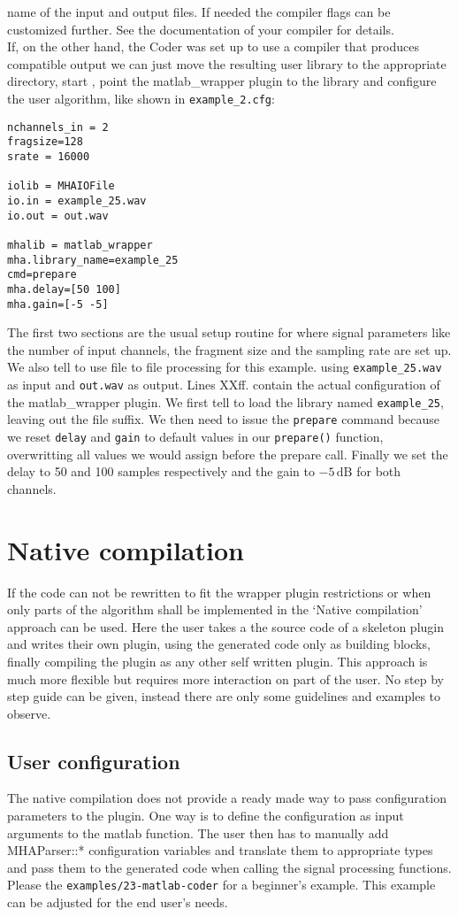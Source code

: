 \documentclass[11pt,a4paper,twoside]{article}
\newcommand{\+}{\discretionary{\mbox{\scriptsize$\hookleftarrow$}}{}{}}
\begin{document}
name of the input and output files. If needed the compiler flags can be customized further.
See the documentation of your compiler for details. \\
If, on the other hand, the \Matlab{} Coder was set up to use a compiler that produces \mha{} compatible
output we can just move the resulting user library to the appropriate directory, start \mha{}, 
point the matlab\_wrapper plugin to the library and configure the user
algorithm, like shown in \texttt{example\_2.cfg}:
\begin{lstlisting}
nchannels_in = 2
fragsize=128
srate = 16000

iolib = MHAIOFile
io.in = example_25.wav
io.out = out.wav

mhalib = matlab_wrapper
mha.library_name=example_25
cmd=prepare
mha.delay=[50 100]
mha.gain=[-5 -5]
\end{lstlisting}
The first two sections are the usual setup routine for \mha{} where signal
parameters like the number of input channels, the fragment size and the sampling
rate are set up. We also tell \mha{} to use file to file processing for this
example. using \texttt{example\_25.wav} as input and \texttt{out.wav} as output.
Lines XXff. contain the actual configuration of the matlab\_wrapper plugin. We
first tell \mha{} to load the library named \texttt{example\_25}, leaving out the
file suffix. We then need to issue the \texttt{prepare} command because we reset
\texttt{delay} and \texttt{gain} to default values in our \texttt{prepare()}
function, overwritting all values we would assign before the prepare call.
Finally we set the delay to 50 and 100 samples respectively and the
gain to $-5\,\mathrm{dB}$ for both channels.

\section{Native compilation}\label{sec:native compilation}
If the code can not be rewritten to fit the wrapper plugin restrictions or when
only parts of the algorithm shall be implemented in \Matlab{} the `Native
compilation' approach can be used.
Here the user takes a the source code of a skeleton \mha{} plugin and writes
their own plugin, using the generated code only as building blocks,
finally compiling the plugin as any other self written \mha{} plugin.
This approach is much more flexible but requires more interaction
on part of the user. No step by step guide can be given, instead there are only
some guidelines and examples to observe. 
\subsection{User configuration}
The native compilation does not provide a ready made way to pass configuration parameters to the plugin.
One way is to define the configuration as input arguments to the matlab function.
The user then has to manually add MHAParser::* configuration variables and translate them to appropriate types and
pass them to the generated code when calling the signal processing functions.
Please the \texttt{examples/23-matlab-coder} for a beginner's example. This
example can be adjusted for the end user's needs.
\end{document}
